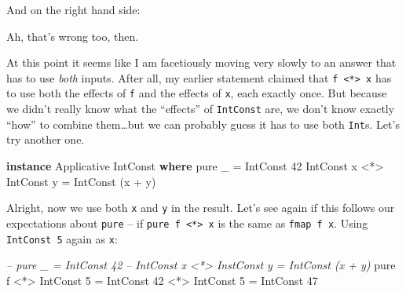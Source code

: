 \documentclass[]{article}
\newenvironment{Shaded}{}{}
\newcommand{\CommentTok}[1]{\textcolor[rgb]{0.38,0.63,0.69}{\textit{#1}}}
\newcommand{\DataTypeTok}[1]{\textcolor[rgb]{0.56,0.13,0.00}{#1}}
\newcommand{\DecValTok}[1]{\textcolor[rgb]{0.25,0.63,0.44}{#1}}
\newcommand{\FunctionTok}[1]{\textcolor[rgb]{0.02,0.16,0.49}{#1}}
\newcommand{\KeywordTok}[1]{\textcolor[rgb]{0.00,0.44,0.13}{\textbf{#1}}}
\newcommand{\NormalTok}[1]{#1}
\begin{document}
And on the right hand side:

\begin{Shaded}
\end{Shaded}

Ah, that's wrong too, then.

At this point it seems like I am facetiously moving very slowly to an answer
that has to use \emph{both} inputs. After all, my earlier statement claimed that
\texttt{f\ \textless{}*\textgreater{}\ x} has to use both the effects of
\texttt{f} and the effects of \texttt{x}, each exactly once. But because we
didn't really know what the ``effects'' of \texttt{IntConst} are, we don't know
exactly ``how'' to combine them\ldots{}but we can probably guess it has to use
both \texttt{Int}s. Let's try another one.

\begin{Shaded}
\begin{Highlighting}[]
\KeywordTok{instance} \DataTypeTok{Applicative} \DataTypeTok{IntConst} \KeywordTok{where}
\NormalTok{    pure _ }\FunctionTok{=} \DataTypeTok{IntConst} \DecValTok{42}
    \DataTypeTok{IntConst}\NormalTok{ x }\FunctionTok{<*>} \DataTypeTok{IntConst}\NormalTok{ y }\FunctionTok{=} \DataTypeTok{IntConst}\NormalTok{ (x }\FunctionTok{+}\NormalTok{ y)}
\end{Highlighting}
\end{Shaded}

Alright, now we use both \texttt{x} and \texttt{y} in the result. Let's see
again if this follows our expectations about \texttt{pure} -- if
\texttt{pure\ f\ \textless{}*\textgreater{}\ x} is the same as
\texttt{fmap\ f\ x}. Using \texttt{IntConst\ 5} again as \texttt{x}:

\begin{Shaded}
\begin{Highlighting}[]
\CommentTok{-- pure _ = IntConst 42}
\CommentTok{-- IntConst x <*> InstConst y = IntConst (x + y)}
\NormalTok{pure f }\FunctionTok{<*>} \DataTypeTok{IntConst} \DecValTok{5} \FunctionTok{=} \DataTypeTok{IntConst} \DecValTok{42} \FunctionTok{<*>} \DataTypeTok{IntConst} \DecValTok{5}
                      \FunctionTok{=} \DataTypeTok{IntConst} \DecValTok{47}
\end{Highlighting}
\end{Shaded}
\end{document}
